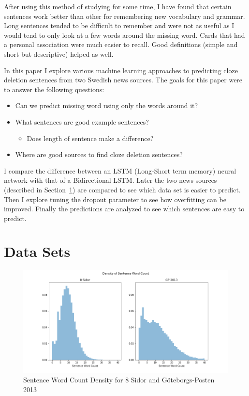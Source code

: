\documentclass[11pt,a4paper]{article}
\begin{document}
After using this method of studying for some time, I have found that certain sentences work better than other for remembering new vocabulary and grammar.
Long sentences tended to be difficult to remember and were not as useful as I would tend to only look at a few words around the missing word.
Cards that had a personal association were much easier to recall.
Good definitions (simple and short but descriptive) helped as well.

In this paper I explore various machine learning approaches to predicting cloze deletion sentences from two Swedish news sources.
The goals for this paper were to answer the following questions:
\begin{itemize}
    \item Can we predict missing word using only the words around it?
    \item What sentences are good example sentences?
        \begin{itemize}
            \item Does length of sentence make a difference?
        \end{itemize}
    \item Where are good sources to find cloze deletion sentences?
\end{itemize}

I compare the difference between an LSTM (Long-Short term memory) neural network with that of a Bidirectional LSTM.
Later the two news sources (described in Section~\ref{sec:datasets}) are compared to see which data set is easier to predict.
Then I explore tuning the dropout parameter to see how overfitting can be improved.
Finally the predictions are analyzed to see which sentences are easy to predict.

\section{Data Sets} \label{sec:datasets}

\begin{figure}[h!]
\centering
\includegraphics[scale=0.5]{word_count_density.png}
\caption{Sentence Word Count Density for 8 Sidor and Göteborgs-Posten 2013}
\label{fig:word_density}
\end{figure}
\end{document}
